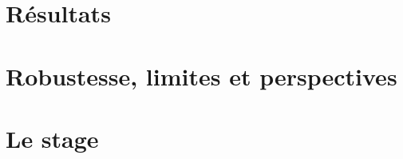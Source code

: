 \documentclass[12pt,a4paper]{report}
\begin{document}
\part{Résultats}
\label{part:resultats}

\part{Robustesse, limites et perspectives}
\label{part:limites}

\part{Le stage}
\label{part:stage}

\appendix
\end{document}
